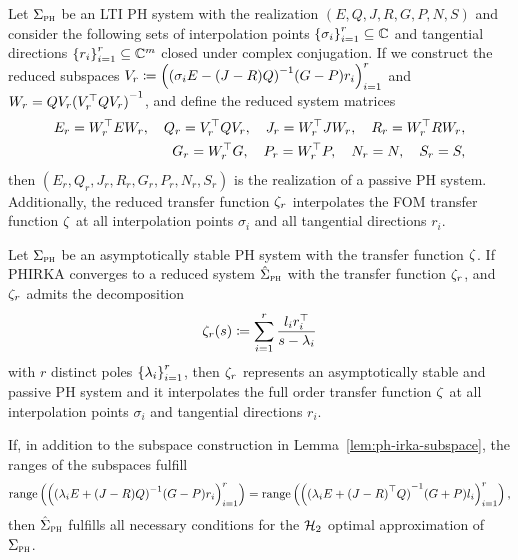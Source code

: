 \begin{lemma}\label{lem:ph-irka-subspace}
    Let $\Sigma_{\textnormal{\scshape ph}}$ be an \ac{LTI} \ac{PH} system with the realization $(E, Q, J, R, G, P, N, S)$ and consider the following sets of interpolation points ${\left\{\sigma_i\right\}}_{i = 1}^r \subseteq \mathbb{C}$ and tangential directions ${\left\{r_i\right\}}_{i = 1}^r \subseteq \mathbb{C}^m$ closed under complex conjugation.
    If we construct the reduced subspaces $V_r \coloneqq {\left( {(\sigma_i E - (J - R) Q)}\inv (G - P) r_i \right)}_{i = 1}^r$ and $W_r = Q V_r {(V_r\trans Q V_r)}\inv$, and define the reduced system matrices
    \begin{equation*}
        \begin{split}
            E_r = W_r^{\top} E W_r,\quad Q_r = V_r^{\top} Q V_r,\quad J_r = W_r^{\top} J W_r,\quad R_r = W_r^{\top} R W_r, \\
            G_r = W_r^{\top} G,\quad P_r = W_r^{\top} P,\quad N_r = N,\quad S_r = S,
        \end{split}
    \end{equation*}
    then $(E_r, Q_r, J_r, R_r, G_r, P_r, N_r, S_r)$ is the realization of a passive \ac{PH} system.
    Additionally, the reduced transfer function $\zeta_r$ interpolates the \ac{FOM} transfer function $\zeta$ at all interpolation points $\sigma_i$ and all tangential directions $r_i$.
\end{lemma}

\begin{theorem}
    Let $\Sigma_{\textnormal{\scshape ph}}$ be an asymptotically stable \ac{PH} system with the transfer function $\zeta$.
    If \ac{PHIRKA} converges to a reduced system $\hat{\Sigma}_{\textnormal{\scshape ph}}$ with the transfer function $\zeta_r$, and $\zeta_r$ admits the decomposition
    \begin{equation*}
        \zeta_r(s) \coloneqq \sum\limits_{i = 1}^r \frac{l_i r_i^{\top}}{s - \lambda_i}
    \end{equation*}
    with $r$ distinct poles ${\left\{\lambda_i\right\}}_{i = 1}^r$, then $\zeta_r$ represents an asymptotically stable and passive \ac{PH} system and it interpolates the full order transfer function $\zeta$ at all interpolation points $\sigma_i$ and tangential directions $r_i$.

    If, in addition to the subspace construction in Lemma~\ref{lem:ph-irka-subspace}, the ranges of the subspaces fulfill
    \begin{equation*}
        \range{{\left( {(\lambda_i E + (J - R) Q)}\inv (G - P) r_i \right)}_{i = 1}^r} = \range{{\left( {(\lambda_i E + {(J - R)}\trans Q)}\inv (G + P) l_i \right)}_{i = 1}^r},
    \end{equation*}
    then $\hat{\Sigma}_{\textnormal{\scshape ph}}$ fulfills all necessary conditions for the $\mathcal{H}_2$ optimal approximation of $\Sigma_{\textnormal{\scshape ph}}$.
\end{theorem}

